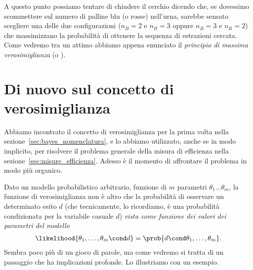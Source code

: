 \begin{table}[!htb]
\end{table}

A questo punto possiamo tentare di chiudere il cerchio dicendo che, se dovessimo
scommettere sul numero di palline blu (o rosse) nell'urna, sarebbe sensato
scegliere una delle due configurazioni ($n_B = 2$ e $n_R = 3$ oppure $n_B = 3$ e
$n_R = 2$) che massimizzano la probabilità di ottenere la sequenza di
estrazioni cercata. Come vedremo tra un attimo abbiamo appena enunciato il
\emph{principio di massima verosimiglianza} (o ).


\section{Di nuovo sul concetto di verosimiglianza}

Abbiamo incontrato il concetto di verosimiglianza per la prima volta nella
sezione~\ref{sec:bayes_nomenclatura}, e lo abbiamo utilizzato, anche se in modo
implicito, per risolvere il problema generale della misura di efficienza nella
sezione~\ref{sec:misure_efficienza}. Adesso è il momento di affrontare il
problema in modo più organico.

Dato un modello probabilistico arbitrario, funzione di $m$ parametri
$\theta_1 \ldots \theta_m$, la funzione di verosimiglianza non è altro che la
probabilità di osservare un determinato esito $d$ (che tecnicamente, lo
ricordiamo, è una probabilità condizionata per la variabile casuale $d$)
\emph{vista come funzione dei valori dei parametri del modello}
\begin{align}
  \likelihood{\theta_1, \ldots, \theta_m \cond d} =
  \prob{d \cond \theta_1, \ldots, \theta_m}.
\end{align}
Sembra poco più di un gioco di parole, ma come vedremo si tratta di un
passaggio che ha implicazioni profonde. Lo illustriamo con un esempio.



